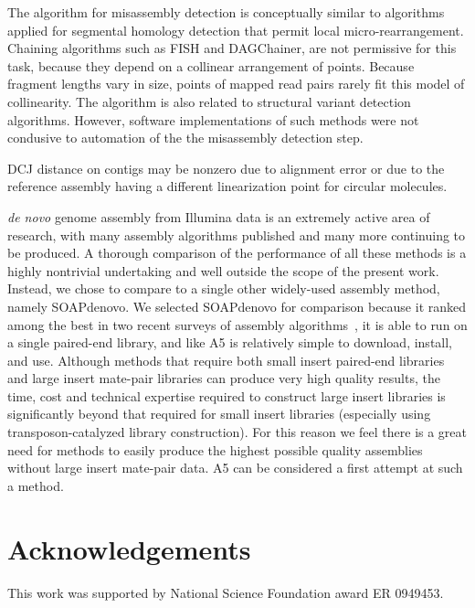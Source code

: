 \documentclass{bioinfo}
\begin{document}
The algorithm for misassembly detection is conceptually similar to algorithms applied for segmental homology detection that permit local 
micro-rearrangement. Chaining algorithms such as FISH and DAGChainer, are not permissive for this task, because they depend on a 
collinear arrangement of points. Because fragment lengths vary in size, points of mapped read pairs rarely fit this model of collinearity. 
The algorithm is also related to structural variant detection algorithms. However, software implementations of such methods were not condusive 
to automation of the the misassembly detection step. 

DCJ distance on contigs may be nonzero due to alignment error or due to the reference assembly having a different linearization point
for circular molecules. 

\emph{de novo} genome assembly from Illumina data is an extremely active area of research, with many assembly algorithms published and many more continuing to be produced.
A thorough comparison of the performance of all these methods is a highly nontrivial undertaking and well outside the scope of the present  
work. Instead, we chose to compare to a single other widely-used assembly method, namely SOAPdenovo. We selected SOAPdenovo for comparison
because it ranked among the best in two recent surveys of assembly algorithms~\citep{Earl2011,Salzberg2011}, it is able to run on a single paired-end
library, and like A5 is relatively simple to download, install, and use. Although methods that require both small insert paired-end libraries
and large insert mate-pair libraries can produce very high quality results, the time, cost and technical expertise required to construct large insert
libraries is significantly beyond that required for small insert libraries (especially using transposon-catalyzed library construction).
For this reason we feel there is a great need for methods to easily produce the highest possible quality assemblies without large insert mate-pair data.
A5 can be considered a first attempt at such a method.

\section*{Acknowledgements}
This work was supported by National Science Foundation award ER 0949453.





\end{document}
